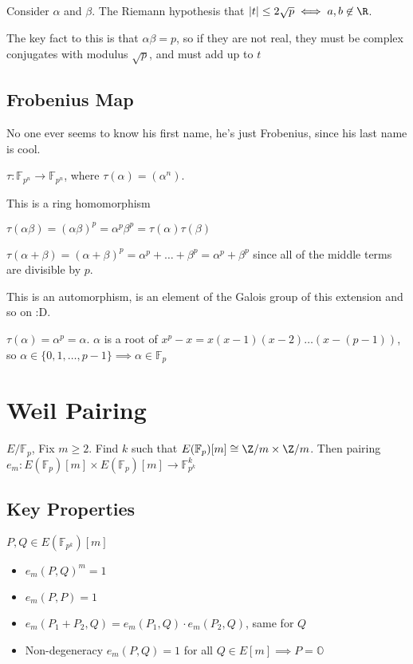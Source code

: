 \documentclass[10pt]{article}
\newcommand{\F}{\mathbb{F}}
\renewcommand{\O}{\mathbb{O}}
\begin{document}
\begin{rmk}
Consider $\alpha$ and $\beta$. The Riemann hypothesis that $|t| \leq 2\sqrt{p} \iff a, b \not\in \R$. 
\end{rmk}
The key fact to this is that $\alpha \beta = p$, so if they are not real, they must be complex conjugates with modulus $\sqrt{p}$, and must add up to $t$

\subsection{Frobenius Map} No one ever seems to know his first name, he's just Frobenius, since his last name is cool.

\begin{defn}
    $\tau : \F_{p^n} \to \F_{p^n}$, where $\tau(\alpha) = (\alpha^n)$. 
\end{defn}

\begin{lem}
    This is a ring homomorphism
\end{lem}
$\tau(\alpha\beta) = (\alpha\beta)^p = \alpha^p\beta^p = \tau(\alpha)\tau(\beta)$

$\tau(\alpha + \beta) = (\alpha + \beta)^p = \alpha^p + \ldots + \beta^p = \alpha^p + \beta^p$ since all of the middle terms are divisible by $p$.

This is an automorphism, is an element of the Galois group of this extension and so on :D.

\begin{rmk}
    $\tau(\alpha)=\alpha^p = \alpha$. $\alpha$ is a root of $x^p - x= x(x - 1)(x -2)\ldots(x - (p-1))$, so $\alpha \in \{0, 1, \ldots, p-1\} \implies \alpha \in \F_p$
\end{rmk}

\section{Weil Pairing} 
$E/\F_p$, Fix $m \geq 2$. Find $k$ such that $E(\F_p)[m] \cong \Z/m \times \Z/m$. Then pairing $e_m : E(\F_p)[m] \times E(\F_p)[m] \to \F_{p^k}^k$

\subsection{Key Properties}
$P, Q \in E(\F_{p^k})[m]$

\begin{itemize}
    \item $e_m(P, Q)^m = 1$
    \item $e_m(P, P) = 1$
    \item $e_m(P_1 + P_2, Q) = e_m(P_1, Q) \cdot e_m(P_2, Q)$, same for $Q$
    \item Non-degeneracy $e_m(P, Q) = 1$ for all $Q \in E[m] \implies P = \O$
\end{itemize}
\end{document}
